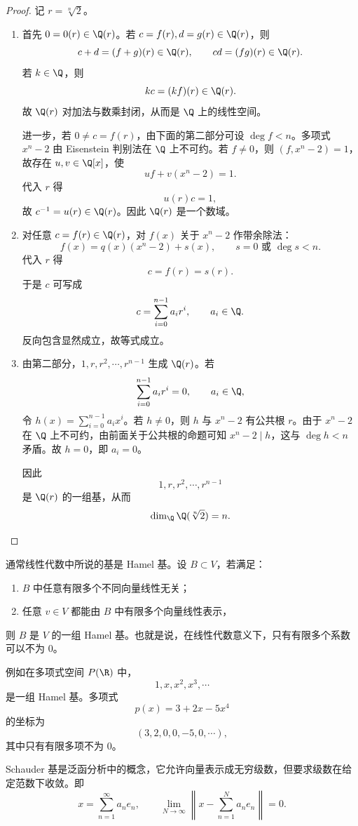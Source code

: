 \begin{proof}
	记 $r=\sqrt[n]{2}$。
	\begin{enumerate}
		\item 首先 $0=0(r)\in\Q(r)$。若 $c=f(r),d=g(r)\in\Q(r)$，则
		\[
		c+d=(f+g)(r)\in\Q(r),
		\qquad
		cd=(fg)(r)\in\Q(r).
		\]
		若 $k\in\Q$，则
		\[
		kc=(kf)(r)\in\Q(r).
		\]
		故 $\Q(r)$ 对加法与数乘封闭，从而是 $\Q$ 上的线性空间。
		
		进一步，若 $0\neq c=f(r)$，由下面的第二部分可设 $\deg f<n$。多项式 $x^n-2$ 由 Eisenstein 判别法在 $\Q$ 上不可约。若 $f\neq 0$，则 $(f,x^n-2)=1$，故存在 $u,v\in\Q[x]$，使
		\[
		uf+v(x^n-2)=1.
		\]
		代入 $r$ 得
		\[
		u(r)c=1,
		\]
		故 $c^{-1}=u(r)\in\Q(r)$。因此 $\Q(r)$ 是一个数域。
		
		\item 对任意 $c=f(r)\in\Q(r)$，对 $f(x)$ 关于 $x^n-2$ 作带余除法：
		\[
		f(x)=q(x)(x^n-2)+s(x),
		\qquad s=0\text{ 或 }\deg s<n.
		\]
		代入 $r$ 得
		\[
		c=f(r)=s(r).
		\]
		于是 $c$ 可写成
		\[
		c=\sum_{i=0}^{n-1}a_ir^i,
		\qquad a_i\in\Q.
		\]
		反向包含显然成立，故等式成立。
		
		\item 由第二部分，$1,r,r^2,\cdots,r^{n-1}$ 生成 $\Q(r)$。若
		\[
		\sum_{i=0}^{n-1}a_ir^i=0,
		\qquad a_i\in\Q,
		\]
		令 $h(x)=\sum_{i=0}^{n-1}a_ix^i$。若 $h\neq0$，则 $h$ 与 $x^n-2$ 有公共根 $r$。由于 $x^n-2$ 在 $\Q$ 上不可约，由前面关于公共根的命题可知 $x^n-2\mid h$，这与 $\deg h<n$ 矛盾。故 $h=0$，即 $a_i=0$。
		
		因此
		\[
		1,r,r^2,\cdots,r^{n-1}
		\]
		是 $\Q(r)$ 的一组基，从而
		\[
		\dim_{\Q}\Q(\sqrt[n]{2})=n.
		\]
	\end{enumerate}
\end{proof}

\begin{definition}
	通常线性代数中所说的基是 Hamel 基。设 $B\subset V$，若满足：
	\begin{enumerate}
		\item $B$ 中任意有限多个不同向量线性无关；
		\item 任意 $v\in V$ 都能由 $B$ 中有限多个向量线性表示，
	\end{enumerate}
	则 $B$ 是 $V$ 的一组 Hamel 基。也就是说，在线性代数意义下，只有有限多个系数可以不为 $0$。
\end{definition}

	
	例如在多项式空间 $P(\R)$ 中，
	\[
	1,x,x^2,x^3,\cdots
	\]
	是一组 Hamel 基。多项式
	\[
	p(x)=3+2x-5x^4
	\]
	的坐标为
	\[
	(3,2,0,0,-5,0,\cdots),
	\]
	其中只有有限多项不为 $0$。
	\begin{definition}
			Schauder 基是泛函分析中的概念，它允许向量表示成无穷级数，但要求级数在给定范数下收敛。即
		\[
		x=\sum_{n=1}^{\infty}a_ne_n,
		\qquad
		\lim_{N\to\infty}\left\|x-\sum_{n=1}^{N}a_ne_n\right\|=0.
		\]
	\end{definition}


